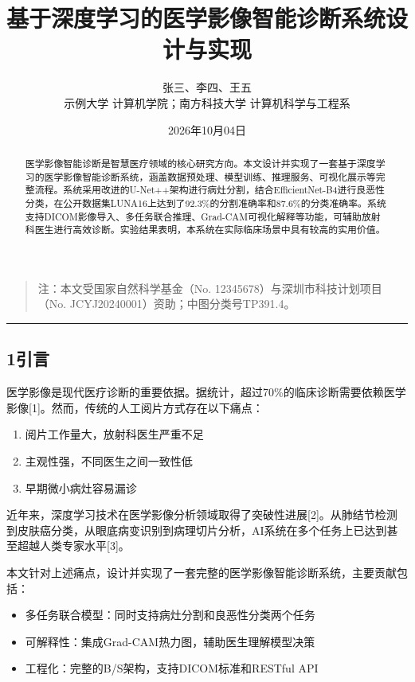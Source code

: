 \documentclass{harryopo-paper}
\title{基于深度学习的医学影像智能诊断系统设计与实现}
\author{张三、李四、王五\\ \fzfs\small 示例大学 计算机学院；南方科技大学 计算机科学与工程系}
\date{2026年10月04日}
\begin{document}
\maketitle
\begin{abstract}
医学影像智能诊断是智慧医疗领域的核心研究方向。本文设计并实现了一套基于深度学习的医学影像智能诊断系统，涵盖数据预处理、模型训练、推理服务、可视化展示等完整流程。系统采用改进的U-Net++架构进行病灶分割，结合EfficientNet-B4进行良恶性分类，在公开数据集LUNA16上达到了92.3\%的分割准确率和87.6\%的分类准确率。系统支持DICOM影像导入、多任务联合推理、Grad-CAM可视化解释等功能，可辅助放射科医生进行高效诊断。实验结果表明，本系统在实际临床场景中具有较高的实用价值。
\end{abstract}

\begin{quote}
注：本文受国家自然科学基金（No. 12345678）与深圳市科技计划项目（No. JCYJ20240001）资助；中图分类号TP391.4。
\end{quote}

\medskip\hrule\medskip

\subsection*{1引言}

医学影像是现代医疗诊断的重要依据。据统计，超过70\%的临床诊断需要依赖医学影像[1]。然而，传统的人工阅片方式存在以下痛点：

\begin{enumerate}
  \item 阅片工作量大，放射科医生严重不足
  \item 主观性强，不同医生之间一致性低
  \item 早期微小病灶容易漏诊
\end{enumerate}

近年来，深度学习技术在医学影像分析领域取得了突破性进展[2]。从肺结节检测到皮肤癌分类，从眼底病变识别到病理切片分析，AI系统在多个任务上已达到甚至超越人类专家水平[3]。

本文针对上述痛点，设计并实现了一套完整的医学影像智能诊断系统，主要贡献包括：

\begin{itemize}
  \item {\fzht 多任务联合模型}：同时支持病灶分割和良恶性分类两个任务
  \item {\fzht 可解释性}：集成Grad-CAM热力图，辅助医生理解模型决策
  \item {\fzht 工程化}：完整的B/S架构，支持DICOM标准和RESTful API
\end{itemize}
\end{document}
